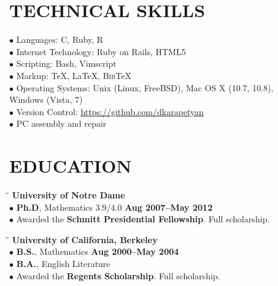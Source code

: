 \documentclass{resume}
\begin{document}
 
\address{\hspace{1.2in} 202-460-5173\\
    \hspace{0.7in}  \href{mailto:david.karapetyan@gmail.com}{david.karapetyan@gmail.com}\\
\hspace{0.7in}   \href{http://davidkarapetyan.com}{http://davidkarapetyan.com}}
\begin{resume}
    \vspace{0.1in}
    \section{TECHNICAL SKILLS}
    \vspace{0.03in}
    $\bullet$ Languages: C, Ruby, R 
    \\
    $\bullet$ Internet Technology: Ruby on Rails, HTML5
    \\
    $\bullet$ Scripting: Bash, Vimscript 
    \\
    $\bullet$ Markup: \TeX{}, \LaTeX{}, B\textsc{ib}\TeX{}
    \\
    $\bullet$ Operating Systems: Unix (Linux, FreeBSD), Mac OS X (10.7, 10.8), \\
    \phantom{$\bullet$} Windows (Vista, 7) 
    \\
    $\bullet$ Version Control:
    \href{https://github.com/dkarapetyan}{https://github.com/dkarapetyan} \\
    $\bullet$ PC assembly and repair 
    \section{EDUCATION} 
    \vspace{-0.1in}
    \begin{tabbing}
        \hspace{2.3in}\= \hspace{2.6in}\= \kill
        \textbf{University of Notre Dame} \\
        $\bullet$ \textbf{Ph.D}, Mathematics 3.9/4.0 \>\>\textbf{Aug 2007--May 2012}
        \\ 
        $\bullet$ Awarded the \textbf{Schmitt Presidential Fellowship}. Full scholarship. \\
    \end{tabbing}	
    \vspace{-0.5in} 
    \begin{tabbing}
        \hspace{2.3in}\= \hspace{2.6in}\= \kill
        \textbf{University of California, Berkeley}
        \\
        $\bullet$ \textbf{B.S.}, Mathematics \>\>\textbf{Aug 2000--May 2004}
        \\
        $\bullet$ \textbf{B.A.}, English Literature 
        \\
        $\bullet$ Awarded the \textbf{Regents Scholarship}. Full scholarship.


\end{tabbing}
\end{resume}
\end{document}
